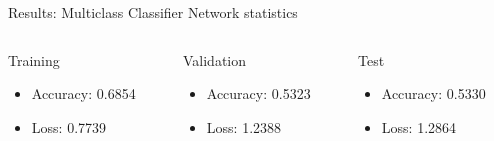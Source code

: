 \documentclass[10pt,handout]{beamer}
\begin{document}
\begin{frame}{Results: Multiclass Classifier}
Network statistics \\
\quad \quad
\begin{columns}
\begin{column}{0.3\textwidth}
Training
\begin{itemize}
\small
\item Accuracy: 0.6854
\item Loss: 0.7739
\end{itemize}
\end{column}
\begin{column}{0.3\textwidth}
Validation
\begin{itemize}
\small
\item Accuracy: 0.5323
\item Loss: 1.2388
\end{itemize}
\end{column}
\begin{column}{0.3\textwidth}
Test
\begin{itemize}
\small
\item Accuracy: 0.5330
\item Loss: 1.2864
\end{itemize}
\end{column}
\end{columns}
\end{frame}
\end{document}
